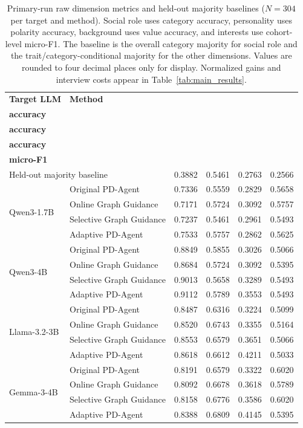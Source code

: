 \documentclass{ieeeaccess}
\begin{document}
\renewcommand{\thetable}{S5}
\begin{table}[H]
\centering
\footnotesize
\setlength{\tabcolsep}{4pt}
\caption{Primary-run raw dimension metrics and held-out majority baselines
($N=304$ per target and method). Social role uses category accuracy, personality uses
polarity accuracy, background uses value accuracy, and interests use cohort-level
micro-F1. The baseline is the overall category majority for social role and the
trait/category-conditional majority for the other dimensions. Values are rounded to
four decimal places only for display. Normalized gains and interview costs appear in
Table~\ref{tab:main_results}.}
\label{tab:primary-raw-metrics}
\begin{tabular*}{\textwidth}{@{\extracolsep{\fill}}llrrrr@{}}
\toprule
\textbf{Target LLM} & \textbf{Method}
& \makecell{\textbf{Social-role}\\\textbf{accuracy}}
& \makecell{\textbf{Personality}\\\textbf{accuracy}}
& \makecell{\textbf{Background}\\\textbf{accuracy}}
& \makecell{\textbf{Interest}\\\textbf{micro-F1}} \\
\midrule
\multicolumn{2}{l}{Held-out majority baseline} & 0.3882 & 0.5461 & 0.2763 & 0.2566 \\
\midrule
\multirow{4}{*}{Qwen3-1.7B}
& Original PD-Agent & 0.7336 & 0.5559 & 0.2829 & 0.5658 \\
& Online Graph Guidance & 0.7171 & 0.5724 & 0.3092 & 0.5757 \\
& Selective Graph Guidance & 0.7237 & 0.5461 & 0.2961 & 0.5493 \\
& Adaptive PD-Agent & 0.7533 & 0.5757 & 0.2862 & 0.5625 \\
\midrule
\multirow{4}{*}{Qwen3-4B}
& Original PD-Agent & 0.8849 & 0.5855 & 0.3026 & 0.5066 \\
& Online Graph Guidance & 0.8684 & 0.5724 & 0.3092 & 0.5395 \\
& Selective Graph Guidance & 0.9013 & 0.5658 & 0.3289 & 0.5493 \\
& Adaptive PD-Agent & 0.9112 & 0.5789 & 0.3553 & 0.5493 \\
\midrule
\multirow{4}{*}{Llama-3.2-3B}
& Original PD-Agent & 0.8487 & 0.6316 & 0.3224 & 0.5099 \\
& Online Graph Guidance & 0.8520 & 0.6743 & 0.3355 & 0.5164 \\
& Selective Graph Guidance & 0.8553 & 0.6579 & 0.3651 & 0.5066 \\
& Adaptive PD-Agent & 0.8618 & 0.6612 & 0.4211 & 0.5033 \\
\midrule
\multirow{4}{*}{Gemma-3-4B}
& Original PD-Agent & 0.8191 & 0.6579 & 0.3322 & 0.6020 \\
& Online Graph Guidance & 0.8092 & 0.6678 & 0.3618 & 0.5789 \\
& Selective Graph Guidance & 0.8158 & 0.6776 & 0.3586 & 0.6020 \\
& Adaptive PD-Agent & 0.8388 & 0.6809 & 0.4145 & 0.5395 \\
\bottomrule
\end{tabular*}
\end{table}
\end{document}
